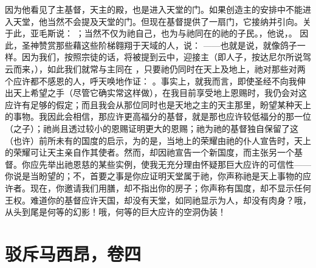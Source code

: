 因为他看见了主基督，天主的殿，也是进入天堂的门。如果创造主的安排中不能进入天堂，他当然不会提及天堂的门。但现在基督提供了一扇门，它接纳并引向。关于此，亚毛斯说： ；当然不仅为祂自己，也为与祂同在的祂的子民。，他说，。 因此，圣神赞赏那些藉这些阶梯翱翔于天域的人，说： ——也就是说，就像鸽子一样。因为我们，按照宗徒的话，将被提到云中，迎接主（即人子，按达尼尔所说驾云而来，），如此我们就常与主同在 ，只要祂仍同时在天上及地上，祂对那些对两个应许都不感恩的人，呼天唤地作证： 。事实上，就我而言，即使圣经不向我伸出天上希望之手（尽管它确实常这样做），在我目前享受地上恩赐时，我仍会对这应许有足够的假定；而且我会从那位同时也是天地之主的天主那里，盼望某种天上的事物。我因此会相信，那应许更高福分的基督，就是那也应许较低福分的那一位（之子）；祂尚且透过较小的恩赐证明更大的恩赐；祂为祂的基督独自保留了这（也许）前所未有的国度的启示，为的是，当地上的荣耀由祂的仆人宣告时，天上的荣耀可让天主亲自作其使者。然而，却因祂宣告一个新国度，而主张另一个基督。你应先举出祂恩慈的某些实例，使我无充分理由怀疑那巨大应许的可信性——你说是当盼望的；不，首要之事是你应证明天堂属于祂，你声称祂是天上事物的应许者。现在，你邀请我们用膳，却不指出你的房子；你声称有国度，却不显示任何王权。难道你的基督应许天国，却没有天堂，如同祂显示为人，却没有肉身？哦，从头到尾是何等的幻影！哦，何等的巨大应许的空洞伪装！\par



\section{驳斥马西昂，卷四}

\par

